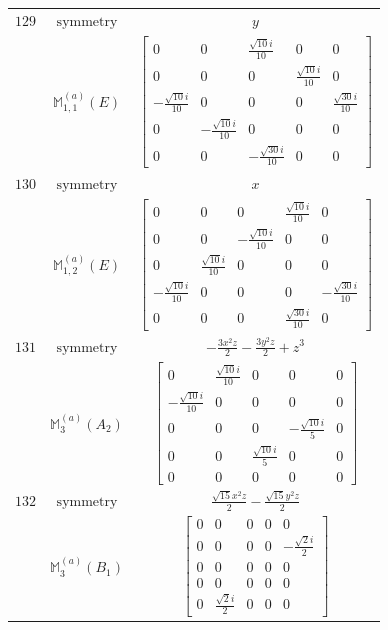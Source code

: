\documentclass[fleqn,8pt,landscape]{jsarticle}
\begin{document}
\begin{longtable}{ccc}
$ 129 $ & $ \text{symmetry} $ & $ y $ \\
$  $ & $ \mathbb{M}_{1,1}^{(a)}(E) $ & $ \begin{bmatrix} 0 & 0 & \frac{\sqrt{10} i}{10} & 0 & 0 \\ 0 & 0 & 0 & \frac{\sqrt{10} i}{10} & 0 \\ - \frac{\sqrt{10} i}{10} & 0 & 0 & 0 & \frac{\sqrt{30} i}{10} \\ 0 & - \frac{\sqrt{10} i}{10} & 0 & 0 & 0 \\ 0 & 0 & - \frac{\sqrt{30} i}{10} & 0 & 0 \end{bmatrix} $ \\ \hline
$ 130 $ & $ \text{symmetry} $ & $ x $ \\
$  $ & $ \mathbb{M}_{1,2}^{(a)}(E) $ & $ \begin{bmatrix} 0 & 0 & 0 & \frac{\sqrt{10} i}{10} & 0 \\ 0 & 0 & - \frac{\sqrt{10} i}{10} & 0 & 0 \\ 0 & \frac{\sqrt{10} i}{10} & 0 & 0 & 0 \\ - \frac{\sqrt{10} i}{10} & 0 & 0 & 0 & - \frac{\sqrt{30} i}{10} \\ 0 & 0 & 0 & \frac{\sqrt{30} i}{10} & 0 \end{bmatrix} $ \\ \hline
$ 131 $ & $ \text{symmetry} $ & $ - \frac{3 x^{2} z}{2} - \frac{3 y^{2} z}{2} + z^{3} $ \\
$  $ & $ \mathbb{M}_{3}^{(a)}(A_{2}) $ & $ \begin{bmatrix} 0 & \frac{\sqrt{10} i}{10} & 0 & 0 & 0 \\ - \frac{\sqrt{10} i}{10} & 0 & 0 & 0 & 0 \\ 0 & 0 & 0 & - \frac{\sqrt{10} i}{5} & 0 \\ 0 & 0 & \frac{\sqrt{10} i}{5} & 0 & 0 \\ 0 & 0 & 0 & 0 & 0 \end{bmatrix} $ \\ \hline
$ 132 $ & $ \text{symmetry} $ & $ \frac{\sqrt{15} x^{2} z}{2} - \frac{\sqrt{15} y^{2} z}{2} $ \\
$  $ & $ \mathbb{M}_{3}^{(a)}(B_{1}) $ & $ \begin{bmatrix} 0 & 0 & 0 & 0 & 0 \\ 0 & 0 & 0 & 0 & - \frac{\sqrt{2} i}{2} \\ 0 & 0 & 0 & 0 & 0 \\ 0 & 0 & 0 & 0 & 0 \\ 0 & \frac{\sqrt{2} i}{2} & 0 & 0 & 0 \end{bmatrix} $ \\ \hline

\end{longtable}
\end{document}
